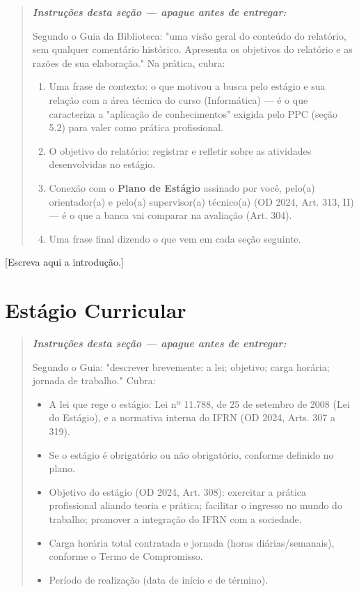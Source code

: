 \documentclass[article,12pt,a4paper]{abntex2}
\newenvironment{instrucoes}{%
  \begin{quotation}\footnotesize\itshape
  \noindent\textbf{\upshape Instruções desta seção — apague antes de entregar:}\par\smallskip
}{%
  \end{quotation}
}
\begin{document}
\begin{instrucoes}
Segundo o Guia da Biblioteca: "uma visão geral do conteúdo do relatório, sem qualquer comentário histórico. Apresenta os objetivos do relatório e as razões de sua elaboração." Na prática, cubra:
\begin{enumerate}
  \item Uma frase de contexto: o que motivou a busca pelo estágio e sua relação com a área técnica do curso (Informática) — é o que caracteriza a "aplicação de conhecimentos" exigida pelo PPC (seção 5.2) para valer como prática profissional.
  \item O objetivo do relatório: registrar e refletir sobre as atividades desenvolvidas no estágio.
  \item Conexão com o \textbf{Plano de Estágio} assinado por você, pelo(a) orientador(a) e pelo(a) supervisor(a) técnico(a) (OD 2024, Art. 313, II) — é o que a banca vai comparar na avaliação (Art. 304).
  \item Uma frase final dizendo o que vem em cada seção seguinte.
\end{enumerate}
\end{instrucoes}

[Escreva aqui a introdução.]

\section{Estágio Curricular}

\begin{instrucoes}
Segundo o Guia: "descrever brevemente: a lei; objetivo; carga horária; jornada de trabalho." Cubra:
\begin{itemize}
  \item A lei que rege o estágio: Lei nº 11.788, de 25 de setembro de 2008 (Lei do Estágio), e a normativa interna do IFRN (OD 2024, Arts. 307 a 319).
  \item Se o estágio é obrigatório ou não obrigatório, conforme definido no plano.
  \item Objetivo do estágio (OD 2024, Art. 308): exercitar a prática profissional aliando teoria e prática; facilitar o ingresso no mundo do trabalho; promover a integração do IFRN com a sociedade.
  \item Carga horária total contratada e jornada (horas diárias/semanais), conforme o Termo de Compromisso.
  \item Período de realização (data de início e de término).
\end{itemize}
\end{instrucoes}
\end{document}
